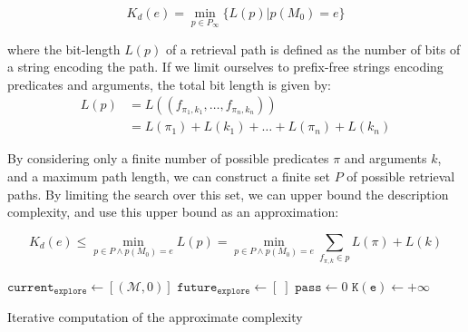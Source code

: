 \documentclass[conference]{IEEEtran}
\begin{document}
\begin{equation}
  \label{eq:k_desc}
  K_d(e) = \min_{p \in P_\infty} \{L(p) | p(M_0) = e\}
\end{equation}

where the bit-length $L(p)$ of a retrieval path is defined as the number of bits of a string encoding the path. If we limit ourselves to prefix-free strings encoding predicates and arguments, the total bit length is given by:
\begin{align}
  \label{eq:bit_lenght_p}
  L(p) & = L((f_{\pi_1,k_1}, \dots, f_{\pi_n, k_n}))     \\
       & = L(\pi_1) + L(k_1) + \dots + L(\pi_n) + L(k_n)
\end{align}


By considering only a finite number of possible predicates $\pi$ and arguments $k$, and a maximum path length, we can construct a finite set $P$ of possible retrieval paths. By limiting the search over this set, we can upper bound the description complexity, and use this upper bound as an approximation:

\begin{equation}
\label{eq:approx_k_desc}
K_d(e) \leq \min_{p \in P \land p(M_0) = e} L(p) = \min_{p \in P \land p(M_0)=e} \sum_{f_{\pi, k} \in p} L(\pi) + L(k)
\end{equation}

\begin{algorithm}
  $\mathtt{current_{explore}} \leftarrow [(\mathcal{M}, 0)]$ \;
  $\mathtt{future_{explore} \leftarrow} [\;]$ \;
  $\mathtt{pass} \leftarrow 0$ \;
  $\mathtt{K(e)} \leftarrow +\infty$ \;
  \caption{Iterative computation of the approximate complexity}
  \label{alg:complex_iter}
\end{algorithm}
\end{document}
